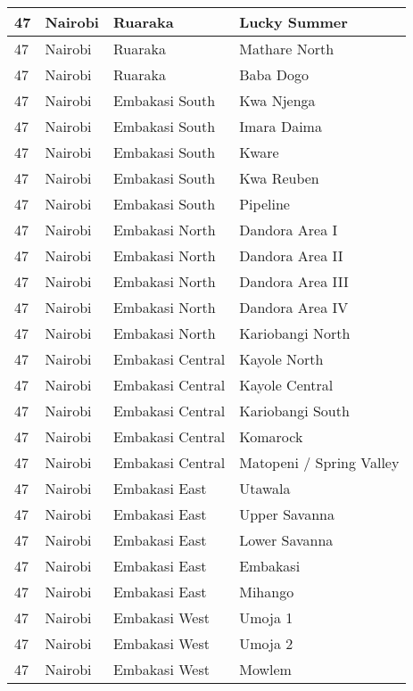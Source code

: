 \begin{table}[!ht]
\begin{tabular}{|l|l|l|l|}
        47 & Nairobi & Ruaraka & Lucky Summer \\ \hline
        47 & Nairobi & Ruaraka & Mathare North \\ \hline
        47 & Nairobi & Ruaraka & Baba Dogo \\ \hline
        47 & Nairobi & Embakasi South & Kwa Njenga \\ \hline
        47 & Nairobi & Embakasi South & Imara Daima \\ \hline
        47 & Nairobi & Embakasi South & Kware \\ \hline
        47 & Nairobi & Embakasi South & Kwa Reuben \\ \hline
        47 & Nairobi & Embakasi South & Pipeline \\ \hline
        47 & Nairobi & Embakasi North & Dandora Area I \\ \hline
        47 & Nairobi & Embakasi North & Dandora Area II \\ \hline
        47 & Nairobi & Embakasi North & Dandora Area III \\ \hline
        47 & Nairobi & Embakasi North & Dandora Area IV \\ \hline
        47 & Nairobi & Embakasi North & Kariobangi North \\ \hline
        47 & Nairobi & Embakasi Central & Kayole North \\ \hline
        47 & Nairobi & Embakasi Central & Kayole Central \\ \hline
        47 & Nairobi & Embakasi Central & Kariobangi South \\ \hline
        47 & Nairobi & Embakasi Central & Komarock \\ \hline
        47 & Nairobi & Embakasi Central & Matopeni / Spring Valley \\ \hline
        47 & Nairobi & Embakasi East & Utawala \\ \hline
        47 & Nairobi & Embakasi East & Upper Savanna \\ \hline
        47 & Nairobi & Embakasi East & Lower Savanna \\ \hline
        47 & Nairobi & Embakasi East & Embakasi \\ \hline
        47 & Nairobi & Embakasi East & Mihango \\ \hline
        47 & Nairobi & Embakasi West & Umoja 1 \\ \hline
        47 & Nairobi & Embakasi West & Umoja 2 \\ \hline
        47 & Nairobi & Embakasi West & Mowlem \\ \hline

\end{tabular}
\end{table}
